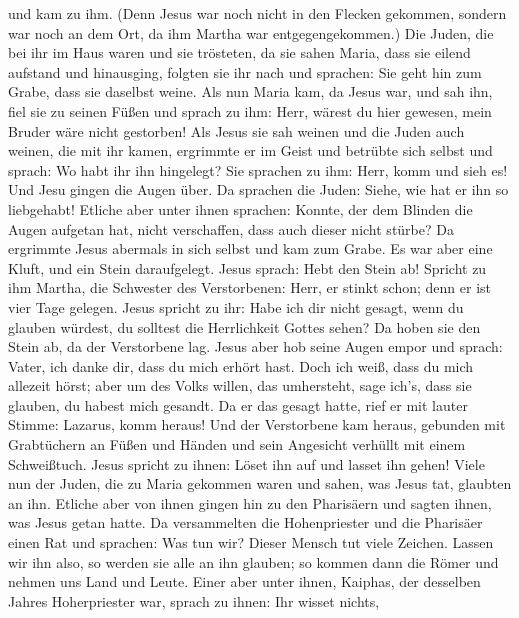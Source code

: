 und kam zu ihm.  (Denn Jesus war noch nicht in den Flecken
gekommen, sondern war noch an dem Ort, da ihm Martha war
entgegengekommen.)  Die Juden, die bei ihr im Haus waren
und sie trösteten, da sie sahen Maria, dass sie eilend aufstand und
hinausging, folgten sie ihr nach und sprachen: Sie geht hin zum Grabe,
dass sie daselbst weine.  Als nun Maria kam, da Jesus war,
und sah ihn, fiel sie zu seinen Füßen und sprach zu ihm: Herr, wärest du
hier gewesen, mein Bruder wäre nicht gestorben!  Als Jesus
sie sah weinen und die Juden auch weinen, die mit ihr kamen, ergrimmte
er im Geist und betrübte sich selbst  und sprach: Wo habt
ihr ihn hingelegt? Sie sprachen zu ihm: Herr, komm und sieh es!
 Und Jesu gingen die Augen über.  Da sprachen
die Juden: Siehe, wie hat er ihn so liebgehabt!  Etliche
aber unter ihnen sprachen: Konnte, der dem Blinden die Augen aufgetan
hat, nicht verschaffen, dass auch dieser nicht stürbe?  Da
ergrimmte Jesus abermals in sich selbst und kam zum Grabe. Es war aber
eine Kluft, und ein Stein daraufgelegt.  Jesus sprach: Hebt
den Stein ab! Spricht zu ihm Martha, die Schwester des Verstorbenen:
Herr, er stinkt schon; denn er ist vier Tage gelegen. 
Jesus spricht zu ihr: Habe ich dir nicht gesagt, wenn du glauben
würdest, du solltest die Herrlichkeit Gottes sehen?  Da
hoben sie den Stein ab, da der Verstorbene lag. Jesus aber hob seine
Augen empor und sprach: Vater, ich danke dir, dass du mich erhört hast.
 Doch ich weiß, dass du mich allezeit hörst; aber um des
Volks willen, das umhersteht, sage ich's, dass sie glauben, du habest
mich gesandt.  Da er das gesagt hatte, rief er mit lauter
Stimme: Lazarus, komm heraus!  Und der Verstorbene kam
heraus, gebunden mit Grabtüchern an Füßen und Händen und sein Angesicht
verhüllt mit einem Schweißtuch. Jesus spricht zu ihnen: Löset ihn auf
und lasset ihn gehen!  Viele nun der Juden, die zu Maria
gekommen waren und sahen, was Jesus tat, glaubten an ihn. 
Etliche aber von ihnen gingen hin zu den Pharisäern und sagten ihnen,
was Jesus getan hatte.  Da versammelten die Hohenpriester
und die Pharisäer einen Rat und sprachen: Was tun wir? Dieser Mensch tut
viele Zeichen.  Lassen wir ihn also, so werden sie alle an
ihn glauben; so kommen dann die Römer und nehmen uns Land und Leute.
 Einer aber unter ihnen, Kaiphas, der desselben Jahres
Hoherpriester war, sprach zu ihnen: Ihr wisset nichts, 
